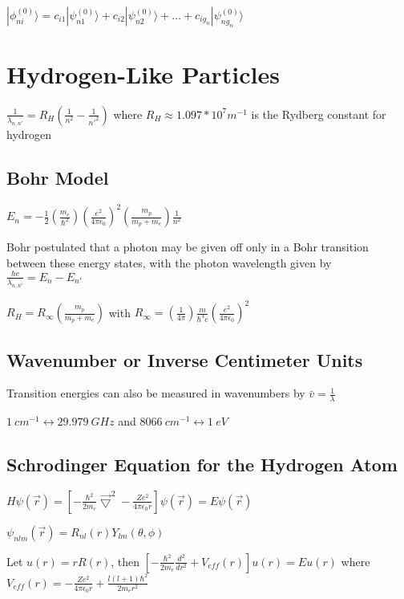 \documentclass[12pt]{article}
\begin{document}
\begin{spacing}{2.0}
$|\phi_{ni}^{(0)} \rangle = c_{i1} |\psi_{n1}^{(0)} \rangle + c_{i2} |\psi_{n2}^{(0)} \rangle + \ldots + c_{ig_n} |\psi_{ng_n}^{(0)} \rangle$

\section{Hydrogen-Like Particles}

$\frac{1}{\lambda_{n,n'}}=R_H \left( \frac{1}{n^2}-\frac{1}{n'^2} \right)$ where $R_H \approx 1.097*10^7 m^{-1}$ is the Rydberg constant for hydrogen

\subsection{Bohr Model}

$E_n=-\frac{1}{2} \left( \frac{m_e}{\hbar^2} \right) \left( \frac{e^2}{4\pi \epsilon_0}\right)^2 \left( \frac{m_p}{m_p+m_e}\right) \frac{1}{n^2}$

Bohr postulated that a photon may be given off only in a Bohr transition between these energy states, with the photon wavelength given by $\frac{hc}{\lambda_{n,n'}}=E_n-E_{n'}$

$R_H= R_{\infty} \left( \frac{m_p}{m_p+m_e} \right)$ with $R_{\infty}=\left( \frac{1}{4\pi} \right) \frac{m}{\hbar^3 c} \left( \frac{e^2}{4\pi\epsilon_0} \right)^2$

\subsection{Wavenumber or Inverse Centimeter Units}

Transition energies can also be measured in wavenumbers by $\bar{v}=\frac{1}{\lambda}$

$1\ cm^{-1} \leftrightarrow 29.979\ GHz$ and $8066\ cm^{-1} \leftrightarrow 1\ eV$

\subsection{Schrodinger Equation for the Hydrogen Atom}

$H\psi(\vec{r})= \left[ -\frac{\hbar^2}{2m_e} \vec{\bigtriangledown}^2 - \frac{Ze^2}{4\pi\epsilon_0r} \right] \psi(\vec{r})=E \psi(\vec{r})$

$\psi_{nlm}(\vec{r})=R_{nl}(r)Y_{lm}(\theta, \phi)$

Let $u(r)=rR(r)$, then $\left[ -\frac{\hbar^2}{2m_e} \frac{d^2}{dr^2} +V_{eff}(r) \right] u(r) =Eu(r)$ where $V_{eff}(r)= -\frac{Ze^2}{4\pi\epsilon_0r} + \frac{l(l+1)\hbar^2}{2m_e r^2}$


\end{spacing}
\end{document}
